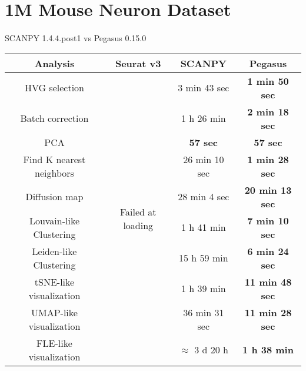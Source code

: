 \documentclass[10pt]{article}
\begin{document}
\section{1M Mouse Neuron Dataset}

\paragraph{}
SCANPY 1.4.4.post1 \qquad vs \qquad Pegasus 0.15.0

\begin{table}[H]
	\centering
	\begin{tabular}{|c|c|c|c|}
		\hline
		Analysis  & Seurat v3 & SCANPY & Pegasus\\
		\hline \hline
		HVG selection  & \multirow{10}{*}{Failed at loading} & 3 min 43 sec  & \textbf{1 min 50 sec}  \\
		\cline{1-1}\cline{3-4}
		Batch correction  & & 1 h 26 min  & \textbf{2 min 18 sec}  \\
		\cline{1-1}\cline{3-4}
		PCA   & & \textbf{57 sec}  & \textbf{57 sec}  \\
		\cline{1-1}\cline{3-4}
		Find K nearest neighbors &  & 26 min 10 sec  & \textbf{1 min 28 sec}  \\
		\cline{1-1}\cline{3-4}
		Diffusion map   & & 28 min 4 sec  & \textbf{20 min 13 sec}  \\
		\cline{1-1}\cline{3-4}
		Louvain-like Clustering &  & 1 h 41 min  & \textbf{7 min 10 sec}  \\
		\cline{1-1}\cline{3-4}
		Leiden-like Clustering & & 15 h 59 min  & \textbf{6 min 24 sec}  \\
		\cline{1-1}\cline{3-4}
		tSNE-like visualization  & & 1 h 39 min  & \textbf{11 min 48 sec}  \\
		\cline{1-1}\cline{3-4}
		UMAP-like visualization  & & 36 min 31 sec   & \textbf{11 min 28 sec}  \\
		\cline{1-1}\cline{3-4}
		FLE-like visualization   & & $\approx$ 3 d 20 h  & \textbf{1 h 38 min}  \\
		\hline
	\end{tabular}
\end{table}
\end{document}
